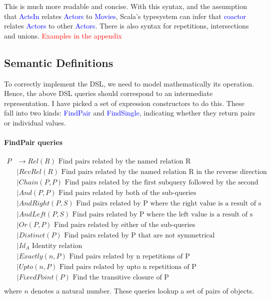 \documentclass[12pt,a4paper,twoside,openright]{report}
\newcommand\todo[1]{\textcolor{red}{#1}}
\newcommand\codeName[1]{\textcolor{blue}{#1}}
\begin{document}
This is much more readable and concise. With this syntax, and the assumption that \codeName{ActsIn} relates \codeName{Actors} to \codeName{Movies}, Scala's typesystem can infer that \codeName{coactor} relates \codeName{Actors} to other \codeName{Actors}. There is also syntax for repetitions, intersections and unions. \todo{Examples in the appendix}
\subsection{Semantic Definitions}
To correctly implement the DSL, we need to model mathematically its operation. Hence, the above DSL queries should correspond to an intermediate representation. I have picked a set of expression constructors to do this. These fall into two kinds: \codeName{FindPair} and \codeName{FindSingle}, indicating whether they return pairs or individual values.

\paragraph{FindPair queries}
\begin{equation}
\label{PDefinition}
\begin{split}
P  &\rightarrow Rel(R) \mbox{ Find pairs related by the named relation R}\\
&\mid RevRel(R) \mbox{ Find pairs related by the named relation R in the reverse direction}\\
&\mid Chain(P, P) \mbox{   Find pairs related by the first subquery followed by the second}\\
&\mid And(P, P) \mbox{  Find pairs related by both of the sub-queries}\\
&\mid AndRight(P, S) \mbox{  Find pairs related by P where the right value is a result of s}\\
&\mid AndLeft(P, S) \mbox{  Find pairs related by P where the left value is a result of s}\\
&\mid Or(P, P) \mbox{  Find pairs related by either of the sub-queries}\\
&\mid Distinct(P) \mbox{  Find pairs related by P that are not symmetrical}\\
&\mid Id_A \mbox{ Identity relation}\\
&\mid Exactly(\mathit{n}, P) \mbox{  Find pairs related by n repetitions of P}\\
&\mid Upto(\mathit{n}, P) \mbox{  Find pairs related by upto n repetitions of P}\\
&\mid FixedPoint(P) \mbox{  Find the transitive closure of P}\\
\end{split}
\end{equation} 
where $n$ denotes a natural number. These queries lookup a set of pairs of objects.\\
\end{document}
